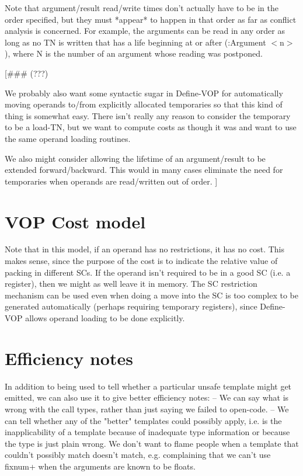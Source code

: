 Note that argument/result read/write times don't actually have to be in the
order specified, but they must *appear* to happen in that order as far as
conflict analysis is concerned.  For example, the arguments can be read in any
order as long as no TN is written that has a life beginning at or after
(:Argument $<$n$>$), where N is the number of an argument whose reading was
postponed.

[\#\#\# (???)

We probably also want some syntactic sugar in Define-VOP for automatically
moving operands to/from explicitly allocated temporaries so that this kind of
thing is somewhat easy.  There isn't really any reason to consider the
temporary to be a load-TN, but we want to compute costs as though it was and
want to use the same operand loading routines.

We also might consider allowing the lifetime of an argument/result to be
extended forward/backward.  This would in many cases eliminate the need for
temporaries when operands are read/written out of order.
]


\section{VOP Cost model}

Note that in this model, if an operand has no restrictions, it has no cost.
This makes sense, since the purpose of the cost is to indicate the
relative value of packing in different SCs.  If the operand isn't required to
be in a good SC (i.e. a register), then we might as well leave it in memory.
The SC restriction mechanism can be used even when doing a move into the SC is
too complex to be generated automatically (perhaps requiring temporary
registers), since Define-VOP allows operand loading to be done explicitly.


\section{Efficiency notes}

  In addition to
being used to tell whether a particular unsafe template might get emitted, we
can also use it to give better efficiency notes:
 -- We can say what is wrong with the call types, rather than just saying we
    failed to open-code.
 -- We can tell whether any of the "better" templates could possibly apply,
    i.e. is the inapplicability of a template because of inadequate type
    information or because the type is just plain wrong.  We don't want to
    flame people when a template that couldn't possibly match doesn't match,
    e.g. complaining that we can't use fixnum+ when the arguments are known to
    be floats.


